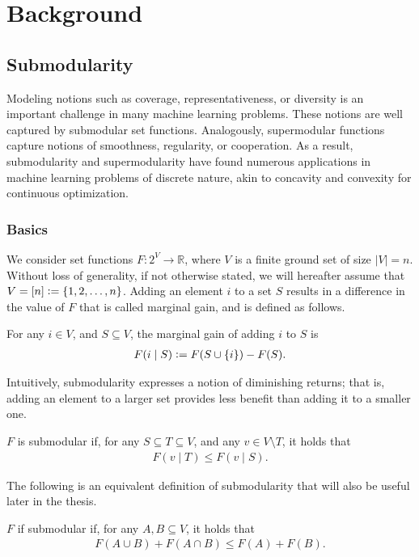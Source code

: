 \chapter{Background} \label{ch:background}

\section{Submodularity} \label{sect:bg_submod}

Modeling notions such as coverage, representativeness, or diversity is an important challenge in many machine learning problems.
These notions are well captured by submodular set functions.
Analogously, supermodular functions capture notions of smoothness, regularity, or cooperation. 
As a result, submodularity and supermodularity have found numerous applications in machine learning problems of discrete nature, akin to concavity and convexity for continuous optimization.

\subsection{Basics}
We consider set functions $F : 2^V \to \mathbb{R}$, where $V$ is a finite ground set of size $|V| = n$.
Without loss of generality, if not otherwise stated, we will hereafter assume that $V = [n] \vcentcolon= \{1, 2, \ldots,n\}$.
Adding an element $i$ to a set $S$ results in a difference in the value of $F$ that is called marginal gain, and is defined as follows.
\begin{definition}
For any $i \in V$, and $S \subseteq V$, the marginal gain of adding $i$ to $S$ is
\begin{align*}
F(i \mid S) \vcentcolon= F(S \cup \{i\}) - F(S).
\end{align*}
\end{definition}

Intuitively, submodularity expresses a notion of diminishing returns; that is, adding an element to a larger set provides less benefit than adding it to a smaller one.
\begin{definition}[Submodularity]
$F$ is submodular if, for any $S \subseteq T \subseteq V$, and any $v \in V \setminus T$, it holds that
\begin{align*}
F(v\mid T) \leq F(v\mid S).
\end{align*}
\end{definition}
\noindent The following is an equivalent definition of submodularity that will also be useful later in the thesis.
\begin{definition}[Submodularity] \label{def:submod}
$F$ if submodular if, for any $A, B \subseteq V$, it holds that
\begin{align*}
F(A \cup B) + F(A \cap B) \leq F(A) + F(B).
\end{align*}
\end{definition}


